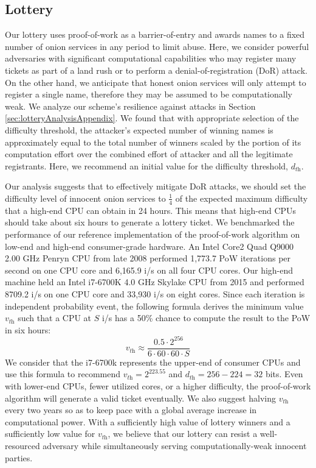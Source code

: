 \documentclass[USenglish,oneside,twocolumn]{article}
\begin{document}

\subsection{Lottery}
\label{sec:lotteryAnalysis}

Our lottery uses proof-of-work as a barrier-of-entry and awards names to a fixed number of onion services in any period to limit abuse. Here, we consider powerful adversaries with significant computational capabilities who may register many tickets as part of a land rush or to perform a denial-of-registration (DoR) attack. On the other hand, we anticipate that honest onion services will only attempt to register a single name, therefore they may be assumed to be computationally weak. We analyze our scheme's resilience against attacks in Section \ref{sec:lotteryAnalysisAppendix}. We found that with appropriate selection of the difficulty threshold, the attacker's expected number of winning names is approximately equal to the total number of winners scaled by the portion of its computation effort over the combined effort of attacker and all the legitimate registrants. Here, we recommend an initial value for the difficulty threshold, $ d_{\textit{th}} $. %

Our analysis suggests that to effectively mitigate DoR attacks, we should set the difficulty level of innocent onion services to $ \frac{1}{4} $ of the expected maximum difficulty that a high-end CPU can obtain in 24 hours. This means that high-end CPUs should take about six hours to generate a lottery ticket. We benchmarked the performance of our reference implementation of the proof-of-work algorithm on low-end and high-end consumer-grade hardware. An Intel Core2 Quad Q9000 2.00 GHz Penryn CPU from late 2008 performed 1,773.7 PoW iterations per second on one CPU core and 6,165.9 i/s on all four CPU cores. Our high-end machine held an Intel i7-6700K 4.0 GHz Skylake CPU from 2015 and performed 8709.2 i/s on one CPU core and 33,930 i/s on eight cores. Since each iteration is independent probability event, the following formula derives the minimum value $ v_{\textit{th}} $ such that a CPU at $ S $ i/s has a 50\% chance to compute the result to the PoW in six hours:
\begin{equation}
v_{\textit{th}} \approx \frac{0.5 \cdot 2^{256}}{6 \cdot 60 \cdot 60 \cdot S}
\end{equation}
We consider that the i7-6700k represents the upper-end of consumer CPUs and use this formula to recommend $ v_{\textit{th}} = 2^{223.55} $ and $d_{\textit{th}} =256-224=32$ bits. Even with lower-end CPUs, fewer utilized cores, or a higher difficulty, the proof-of-work algorithm will generate a valid ticket eventually. We also suggest halving $ v_{\textit{th}} $ every two years so as to keep pace with a global average increase in computational power. With a sufficiently high value of lottery winners and a sufficiently low value for $ v_{\textit{th}} $, we believe that our lottery can resist a well-resourced adversary while simultaneously serving computationally-weak innocent parties.
\end{document}
